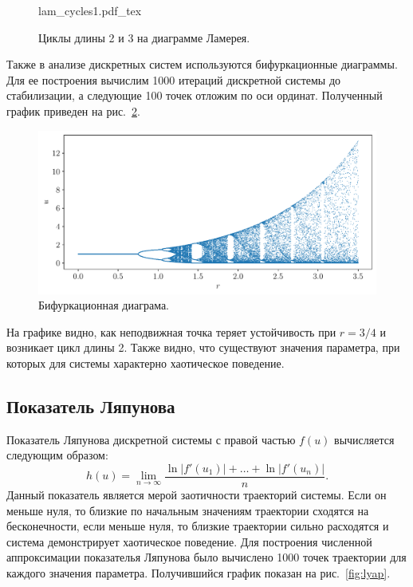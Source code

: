 \documentclass[12pt, a4paper]{article} %
\newcommand{\incfig}[1]{%
    \def\svgwidth{\columnwidth}
    {#1.pdf_tex}
}
\begin{document}
\begin{figure}[ht]
    \centering
    \incfig{lam_cycles1}
    \caption{Циклы длины 2 и 3 на диаграмме Ламерея.}
    \label{fig:lam_cycles1}
\end{figure}

Также в анализе дискретных систем используются бифуркационные диаграммы.
Для ее построения вычислим 1000 итераций дискретной системы до стабилизации, а следующие 100 точек отложим по оси ординат.
Полученный график приведен на рис.~\ref{fig:bifurc1}.

\begin{figure}[ht]
    \centering
    \includegraphics[width=\textwidth]{figures/bifurc1.pdf}
    \caption{Бифуркационная диаграма.}
    \label{fig:bifurc1}
\end{figure}

На графике видно, как неподвижная точка теряет устойчивость при $r=3\!/4$ и возникает цикл длины 2. 
Также видно, что существуют значения параметра, при которых для системы характерно хаотическое поведение.

\subsection{Показатель Ляпунова}

Показатель Ляпунова дискретной системы с правой частью $f(u)$ вычисляется следующим образом:
 \begin{equation}\label{eq:lyap}
     h(u) = \lim\limits_{n \rightarrow \infty}
     \frac{\ln \lvert f'(u_1) \rvert +\ldots + \ln \lvert f'(u_n) \rvert }{n}
.\end{equation} 
Данный показатель является мерой заотичности траекторий системы.
Если он меньше нуля, то близкие по начальным значениям траектории сходятся на бесконечности,
если меньше нуля, то близкие траектории сильно расходятся и система демонстрирует хаотическое поведение.
Для построения численной аппроксимации показателья Ляпунова было вычислено 1000 точек траектории для каждого значения параметра.
Получившийся график показан на рис.~\ref{fig:lyap}.
\end{document}
